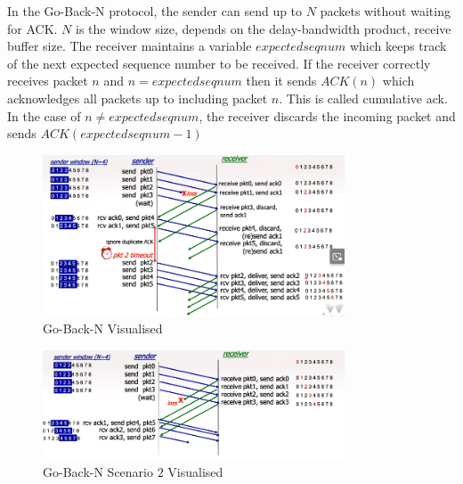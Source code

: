 \documentclass[a4paper]{article}
\theoremstyle{plain}
\theoremstyle{definition}
\newtheorem{defn}{Definition}[section]
\theoremstyle{remark}
\begin{document}
\begin{tcolorbox}[colback=black!3!white,colframe=black!60!white,title=\begin{defn}Go-Back-N Protocol \label{Go-Back-N Protocol}\end{defn}]
In the Go-Back-N protocol, the sender can send up to $N$ packets without waiting for ACK. $N$ is the window size, depends on the delay-bandwidth product, receive buffer size. The receiver maintains a variable $expectedseqnum$ which keeps track of the next expected sequence number to be received. If the receiver correctly receives packet $n$ and $n=expectedseqnum$ then it sends $ACK(n)$ which acknowledges all packets up to including packet $n$. This is called cumulative ack. In the case of $n \neq expectedseqnum$, the receiver discards the incoming packet and sends $ACK(expectedseqnum-1)$ 
\begin{figure}[H]
	\centering
	\includegraphics[width=0.8\textwidth]{fiftyseven.png}
	\caption{Go-Back-N Visualised}
	\label{fig:fiftyseven-png}
\end{figure}
\begin{figure}[H]
	\centering
	\includegraphics[width=0.8\textwidth]{fiftyeight.png}
	\caption{Go-Back-N Scenario $2$ Visualised}
	\label{fig:fiftyeight-png}
\end{figure}
\end{tcolorbox}
\end{document}
